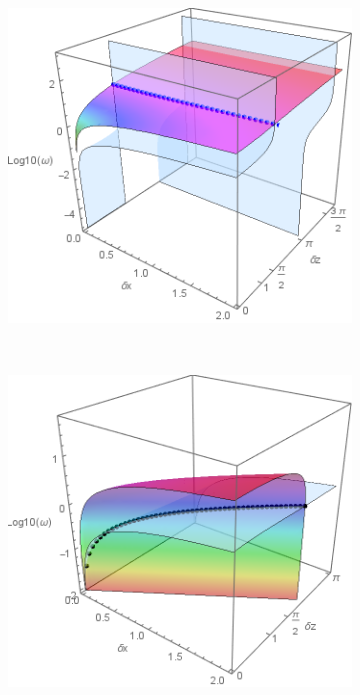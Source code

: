 \documentclass[a4paper,11pt]{article}
\begin{document}
\begin{figure}[!h]
\begin{subfigure}{0.36\linewidth}
		\caption{}
	\end{subfigure}
	~
	\centering		
	\begin{subfigure}{0.36\linewidth}
		\includegraphics[width=1\linewidth]{FIGURES/Disp_Full_acous_kz_real.png}
		\caption{}
	\end{subfigure}
	~
	\centering
	\begin{subfigure}{0.36\linewidth}
		\includegraphics[width=1\linewidth]{FIGURES/Disp_Full_acous_kz_imag.png}
		\caption{}
	\end{subfigure}
	

\end{figure}
\end{document}
